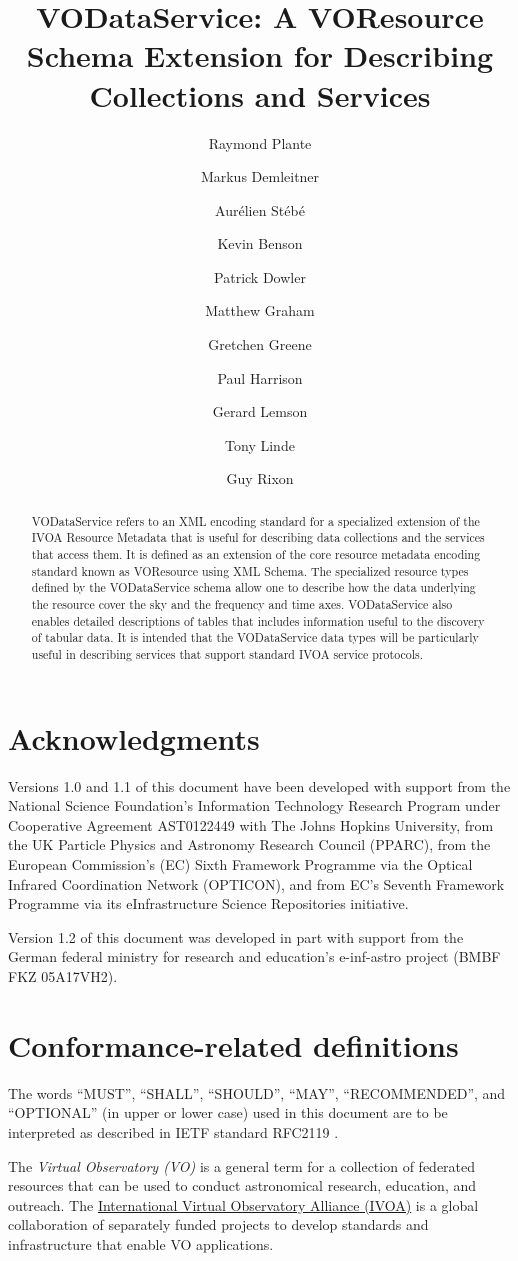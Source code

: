\documentclass[11pt,a4paper]{ivoa}
\title{VODataService: A VOResource Schema Extension for Describing
Collections and Services}
\author[http://www.ivoa.net/twiki/bin/view/IVOA/RayPlante]{Raymond Plante}
\author[http://www.ivoa.net/twiki/bin/view/IVOA/MarkusDemleitner]{Markus Demleitner}
\author[http://www.ivoa.net/twiki/bin/view/IVOA/AurelienStebe]{Aurélien Stébé}
\author[http://www.ivoa.net/twiki/bin/view/IVOA/KevinBenson]{Kevin Benson}
\author[http://www.ivoa.net/twiki/bin/view/IVOA/PatrickDowler]{Patrick Dowler}
\author[http://www.ivoa.net/twiki/bin/view/IVOA/MatthewGraham]{Matthew Graham}
\author[http://www.ivoa.net/twiki/bin/view/IVOA/GretchenGreene]{Gretchen Greene}
\author[http://www.ivoa.net/twiki/bin/view/IVOA/PaulHarrison]{Paul Harrison}
\author[http://www.ivoa.net/twiki/bin/view/IVOA/GerardLemson]{Gerard Lemson}
\author[http://www.ivoa.net/twiki/bin/view/IVOA/TonyLinde]{Tony Linde}
\author[http://www.ivoa.net/twiki/bin/view/IVOA/GuyRixon]{Guy Rixon}
\begin{document}
\begin{abstract}
VODataService refers to an XML encoding standard for a specialized
extension of the IVOA Resource Metadata that is useful for describing
data collections and the services that access them.  It is defined as
an extension of the core resource metadata encoding standard known as
VOResource \citep{2018ivoa.spec.0625P} using XML Schema.
The specialized resource types defined by the VODataService schema
allow one to describe how the data underlying the resource cover the
sky and the frequency and time axes.
VODataService also enables detailed
descriptions of tables that includes information useful to the
discovery of tabular data.  It is intended that the VODataService data
types will be particularly useful in describing services that support
standard IVOA service protocols.
\end{abstract}

\section*{Acknowledgments}

Versions 1.0 and 1.1 of this document have been developed with support from the
National Science Foundation's
Information Technology Research Program under Cooperative Agreement
AST0122449 with The Johns Hopkins University, from the
UK Particle Physics and Astronomy
Research Council (PPARC), from the European Commission's (EC)
Sixth
Framework Programme via the
Optical Infrared Coordination Network (OPTICON), and from EC's
Seventh Framework Programme
via its
eInfrastructure Science Repositories initiative.

Version 1.2 of this document was developed in part with support from the
German federal ministry for research and education's e-inf-astro project (BMBF
FKZ 05A17VH2).


\section*{Conformance-related definitions}

The words ``MUST'', ``SHALL'', ``SHOULD'', ``MAY'', ``RECOMMENDED'', and
``OPTIONAL'' (in upper or lower case) used in this document are to be
interpreted as described in IETF standard RFC2119 \citep{std:RFC2119}.

The \emph{Virtual Observatory (VO)} is a
general term for a collection of federated resources that can be used
to conduct astronomical research, education, and outreach.
The \href{http://www.ivoa.net}{International
Virtual Observatory Alliance (IVOA)} is a global
collaboration of separately funded projects to develop standards and
infrastructure that enable VO applications.
\end{document}
